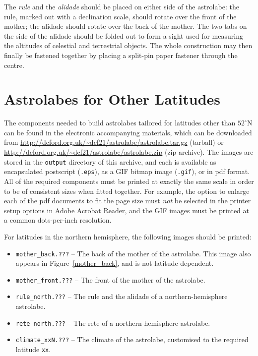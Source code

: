 \documentclass[a4paper,onecolumn,10pt]{article}
\begin{document}
The {\it rule} and the {\it alidade} should be placed on either side of the
astrolabe: the rule, marked out with a declination scale, should rotate over
the front of the mother; the alidade should rotate over the back of the mother.
The two tabs on the side of the alidade should be folded out to form a sight
used for measuring the altitudes of celestial and terrestrial objects.  The
whole construction may then finally be fastened together by placing a split-pin
paper fastener through the centre.

\section*{Astrolabes for Other Latitudes}

The components needed to build astrolabes tailored for latitudes other than
$52^\circ$N can be found in the electronic accompanying materials, which can be
downloaded from \url{http://dcford.org.uk/~dcf21/astrolabe/astrolabe.tar.gz}
(tarball) or \url{http://dcford.org.uk/~dcf21/astrolabe/astrolabe.zip} (zip
archive).  The images are stored in the {\tt output} directory of this archive,
and each is available as encapsulated postscript ({\tt .eps}), as a GIF bitmap
image ({\tt .gif}), or in pdf format.  All of the required components must be
printed at exactly the same scale in order to be of consistent sizes when
fitted together. For example, the option to enlarge each of the pdf documents
to fit the page size must {\it not} be selected in the printer setup options in
Adobe Acrobat Reader, and the GIF images must be printed at a common
dots-per-inch resolution.

For latitudes in the northern hemisphere, the following images should be
printed:
\begin{itemize}
\item {\tt mother\_back.???} -- The back of the mother of the astrolabe. This image also appears in Figure~\ref{mother_back}, and is not latitude dependent.
\item {\tt mother\_front.???} -- The front of the mother of the astrolabe.
\item {\tt rule\_north.???} -- The rule and the alidade of a northern-hemisphere astrolabe.
\item {\tt rete\_north.???} -- The rete of a northern-hemisphere astrolabe.
\item{\tt climate\_xxN.???} -- The climate of the astrolabe, customised to the required latitude {\tt xx}.
\end{itemize}
\end{document}
